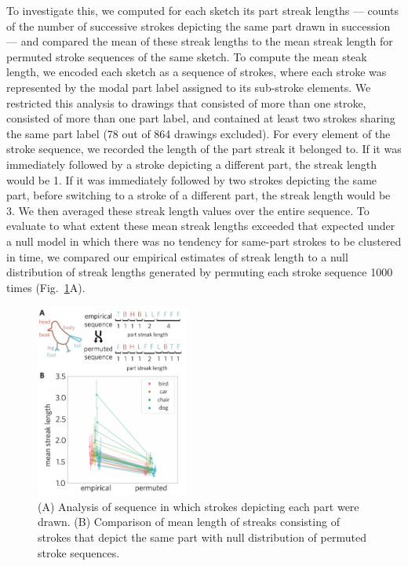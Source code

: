 \documentclass[10pt,letterpaper]{article}
\begin{document}
To investigate this, we computed for each sketch its part streak lengths — counts of the number of successive strokes depicting the same part drawn in succession — and compared the mean of these streak lengths to the mean streak length for permuted stroke sequences of the same sketch. 
To compute the mean steak length, we encoded each sketch as a sequence of strokes, where each stroke was represented by the modal part label assigned to its sub-stroke elements. 
We restricted this analysis to drawings that consisted of more than one stroke, consisted of more than one part label, and contained at least two strokes sharing the same part label (78 out of 864 drawings excluded). 
For every element of the stroke sequence, we recorded the length of the part streak it belonged to. 
If it was immediately followed by a stroke depicting a different part, the streak length would be 1. 
If it was immediately followed by two strokes depicting the same part, before switching to a stroke of a different part, the streak length would be 3. 
We then averaged these streak length values over the entire sequence. 
To evaluate to what extent these mean streak lengths exceeded that expected under a null model in which there was no tendency for same-part strokes to be clustered in time, we compared our empirical estimates of streak length to a null distribution of streak lengths generated by permuting each stroke sequence 1000 times (Fig.~\ref{stroke_sequence_fig}A). 

\begin{figure}[ht]
\centering
\includegraphics[width=0.45\textwidth]{figures/6_part_sequence.pdf}
\caption{(A) Analysis of sequence in which strokes depicting each part were drawn. (B) Comparison of mean length of streaks consisting of strokes that depict the same part with null distribution of permuted stroke sequences.}
\label{stroke_sequence_fig}
\end{figure}
\end{document}
